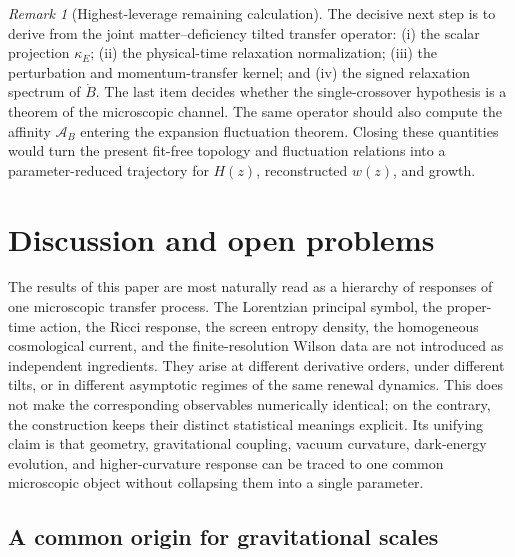 \documentclass[11pt]{article}
\theoremstyle{definition}
\theoremstyle{remark}
\newtheorem{remark}[theorem]{Remark}
\begin{document}
\begin{remark}[Highest-leverage remaining calculation]
The decisive next step is to derive from the joint matter--deficiency tilted
transfer operator: \textup{(i)} the scalar projection \(\kappa_E\); \textup{(ii)}
the physical-time relaxation normalization; \textup{(iii)} the perturbation and
momentum-transfer kernel; and \textup{(iv)} the signed relaxation spectrum of
\(\dot B\).  The last item decides whether the single-crossover hypothesis is a
theorem of the microscopic channel.  The same operator should also compute the
affinity \(\mathcal A_B\) entering the expansion fluctuation theorem.  Closing
these quantities would turn the present fit-free topology and fluctuation
relations into a parameter-reduced trajectory for \(H(z)\), reconstructed
\(w(z)\), and growth.
\end{remark}

\section{Discussion and open problems}
\label{sec:interpretation}

The results of this paper are most naturally read as a hierarchy of responses of one microscopic transfer process.  The Lorentzian principal symbol, the proper-time action, the Ricci response, the screen entropy density, the homogeneous cosmological current, and the finite-resolution Wilson data are not introduced as independent ingredients.  They arise at different derivative orders, under different tilts, or in different asymptotic regimes of the same renewal dynamics.  This does not make the corresponding observables numerically identical; on the contrary, the construction keeps their distinct statistical meanings explicit.  Its unifying claim is that geometry, gravitational coupling, vacuum curvature, dark-energy evolution, and higher-curvature response can be traced to one common microscopic object without collapsing them into a single parameter.

\subsection{A common origin for gravitational scales}
\end{document}
